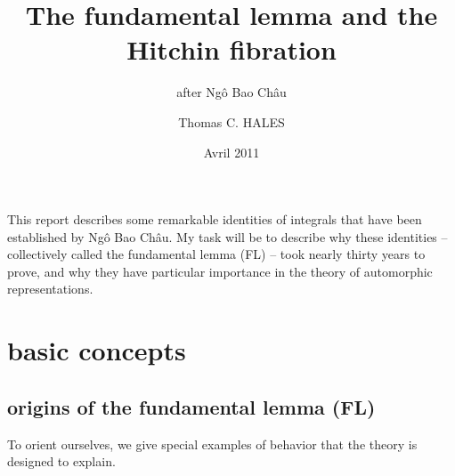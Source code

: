 \documentclass[brochure,english,12pt]{bourbaki}
\date{Avril 2011}
\title{The fundamental lemma and the Hitchin fibration}
\subtitle{after Ng\^o Bao Ch\^au}
\author{Thomas C. HALES}
\theoremstyle{plain}
\begin{document}
\maketitle



{


}

\bigskip



This report describes some remarkable identities of integrals that have
been established by Ng\^o Bao Ch\^au.   My task will be to describe
why these identities -- collectively called the fundamental lemma (FL) --
took nearly thirty years to prove, and why they have particular
importance in the theory of automorphic
representations.



\section{basic concepts}

\subsection{origins of the fundamental lemma (FL)}\label{sec:origin}


To orient ourselves, we give special examples of
behavior that the theory is designed to explain.
\end{document}
